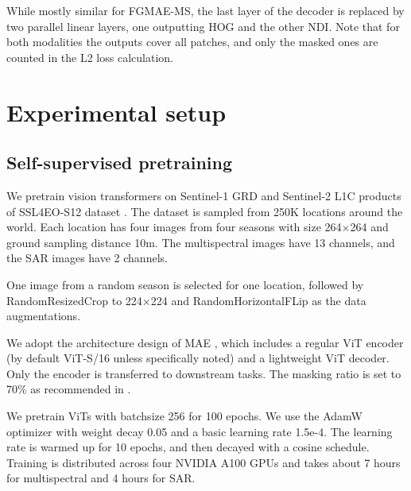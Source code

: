 \documentclass[lettersize,journal]{IEEEtran}
\begin{document}
While mostly similar for FGMAE-MS, the last layer of the decoder is replaced by two parallel linear layers, one outputting HOG and the other NDI. Note that for both modalities the outputs cover all patches, and only the masked ones are counted in the L2 loss calculation.





\section{Experimental setup}

\subsection{Self-supervised pretraining}

\hspace{0.3em}
We pretrain vision transformers on Sentinel-1 GRD and Sentinel-2 L1C products of SSL4EO-S12 dataset \cite{wang2023ssl4eo}. The dataset is sampled from 250K locations around the world. Each location has four images from four seasons with size 264$\times$264 and ground sampling distance 10m. The multispectral images have 13 channels, and the SAR images have 2 channels.

\vspace{0.5em}
\hspace{0.3em}
One image from a random season is selected for one location, followed by RandomResizedCrop to 224$\times$224 and RandomHorizontalFLip as the data augmentations.

\vspace{0.5em}
\hspace{0.3em}
We adopt the architecture design of MAE \cite{he2022masked}, which includes a regular ViT encoder (by default ViT-S/16 unless specifically noted) and a lightweight ViT decoder. Only the encoder is transferred to downstream tasks. The masking ratio is set to 70\% as recommended in \cite{wang2023ssl4eo}.

\vspace{0.5em}
\hspace{0.3em}
We pretrain ViTs with batchsize 256 for 100 epochs. We use the AdamW optimizer \cite{loshchilov2018decoupled} with weight decay 0.05 and a basic learning rate 1.5e-4. The learning rate is warmed up for 10 epochs, and then decayed with a cosine schedule. Training is distributed across four NVIDIA A100 GPUs and takes about 7 hours for multispectral and 4 hours for SAR. 
\end{document}
